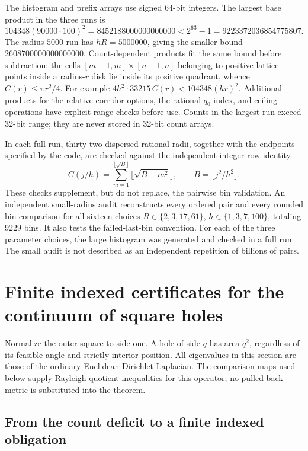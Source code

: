 \documentclass[11pt,reqno]{amsart}
\numberwithin{equation}{section}
\begin{document}
The histogram and prefix arrays use signed 64-bit integers.  The largest
base product in the three runs is
\[
 104348(90000\cdot100)^2=8452188000000000000
       <2^{63}-1=9223372036854775807.
\]
The radius-$5000$ run has $hR=5000000$, giving the smaller bound
$2608700000000000000$.  Count-dependent products fit the same bound
before subtraction: the cells $[m-1,m]\times[n-1,n]$ belonging to
positive lattice points inside a radius-$r$ disk lie inside its positive
quadrant, whence $C(r)\le\pi r^2/4$.  For example
$4h^2\cdot33215\,C(r)<104348(hr)^2$.
Additional products for the relative-corridor options, the rational
$q_0$ index, and ceiling operations have explicit range checks before
use.  Counts in the largest run exceed 32-bit range; they are never
stored in 32-bit count arrays.

In each full run, thirty-two dispersed rational radii, together with
the endpoints specified by the code, are checked against the independent
integer-row identity
\[
 C(j/h)=\sum_{m=1}^{\lfloor\sqrt B\rfloor}
                   \lfloor\sqrt{B-m^2}\rfloor,
 \qquad B=\lfloor j^2/h^2\rfloor.
\]
These checks supplement, but do not replace, the pairwise bin validation.
An independent small-radius audit reconstructs every ordered pair and
every rounded bin comparison for all sixteen choices
$R\in\{2,3,17,61\}$, $h\in\{1,3,7,100\}$, totaling $9229$ bins.
It also tests the failed-last-bin convention. For each of the three
parameter choices, the large histogram was generated and checked in a
full run. The small audit is not described as an independent repetition
of billions of pairs.

\section{Finite indexed certificates for the continuum of square holes}
\label{arith:census}

Normalize the outer square to side one.  A hole of side $q$ has area
$q^2$, regardless of its feasible angle and strictly interior position.
All eigenvalues in this section are those of the ordinary Euclidean
Dirichlet Laplacian.  The comparison maps used below supply Rayleigh
quotient inequalities for this operator; no pulled-back metric is
substituted into the theorem.

\subsection{From the count deficit to a finite indexed obligation}
\end{document}
